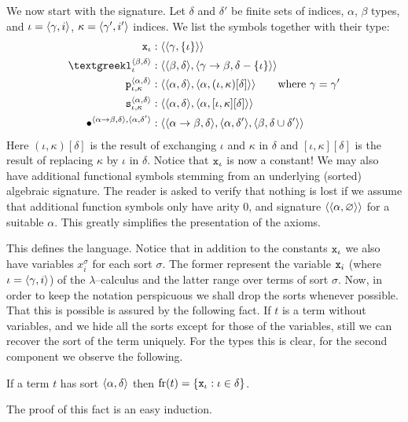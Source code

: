 We now start with the signature. Let $\delta$ and $\delta'$ be finite 
sets of indices, $\alpha$, $\beta$ types, and $\iota = \langle \gamma, i\rangle$, 
$\kappa = \langle \gamma', i'\rangle$ indices. We list the symbols together with 
their type:
\begin{subequations}
\begin{align}
\mbox{\tt x}_{\iota} & :  \auf\auf\gamma, \{\iota\}\zu\zu  \\
\tlambda^{\auf\beta,\delta\zu}_{\iota} & : 
\auf \auf \beta, \delta\zu, \auf \gamma\pf\beta, \delta - \{\iota\}\zu\zu \\
\mbox{\tt p}_{\iota,\kappa}^{\auf \alpha, \delta\zu} & :
\auf \auf \alpha, \delta\zu, \auf \alpha, (\iota, \kappa)[\delta]\zu\zu\qquad 
\text{where $\gamma = \gamma'$} \\
\mbox{\tt s}_{\iota, \kappa}^{\auf \alpha, \delta\zu} & :  
\auf \auf \alpha, \delta\zu, \auf \alpha, [\iota, \kappa][\delta]\zu\zu \\
\bullet^{\auf \alpha\pf\beta, \delta\zu, \auf \alpha, \delta'\zu} 
   & : \auf \auf \alpha\pf\beta, \delta\zu, 
\auf \alpha, \delta'\zu, \auf \beta, \delta \cup \delta'\zu\zu
\end{align}
\end{subequations}
Here $(\iota, \kappa)[\delta]$ is the result of exchanging $\iota$ and 
$\kappa$ in $\delta$ and  $[\iota, \kappa][\delta]$ is the result of 
replacing $\kappa$ by $\iota$ in $\delta$. 
Notice that $\mbox{\tt x}_{\iota}$ is now a constant! 
We may also have additional functional symbols stemming from an 
underlying (sorted) algebraic signature. The reader is asked to 
verify that nothing is lost if we assume that additional function 
symbols only have arity 0, and signature $\langle \langle \alpha, 
\varnothing\rangle\rangle$ for a suitable $\alpha$. This greatly simplifies 
the presentation of the axioms. 

This defines the language. Notice that in addition to the constants 
$\mbox{\tt x}_{\iota}$ we also have variables $x_i^{\sigma}$ for each 
sort $\sigma$. The former represent the variable $\mbox{\tt x}_i$ (where 
$\iota = \langle \gamma, i\rangle$) of the $\lambda$--calculus and the latter 
range over terms of sort $\sigma$. Now, in order to keep the notation 
perspicuous we shall drop the sorts whenever possible. That this is 
possible is assured by the following fact. If $t$ is a term without 
variables, and we hide all the sorts except for those of the variables, 
still we can recover the sort of the term uniquely. For the types this 
is clear, for the second component we observe the following. 
\begin{lem}
If a term $t$ has sort $\langle \alpha, \delta\rangle$ then
$\operatorname{fr}(t) = \{\mbox{\tt x}_{\iota} : \iota \in \delta\}$.
\end{lem}
The proof of this fact is an easy induction.

